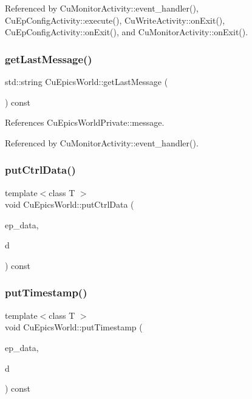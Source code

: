 Referenced by Cu\+Monitor\+Activity\+::event\+\_\+handler(), Cu\+Ep\+Config\+Activity\+::execute(), Cu\+Write\+Activity\+::on\+Exit(), Cu\+Ep\+Config\+Activity\+::on\+Exit(), and Cu\+Monitor\+Activity\+::on\+Exit().

\mbox{\label{classCuEpicsWorld_a0f5eb329733ebae6077a440c7610d98d}} 
\subsubsection{get\+Last\+Message()}
{\footnotesize\ttfamily std\+::string Cu\+Epics\+World\+::get\+Last\+Message (\begin{DoxyParamCaption}{ }\end{DoxyParamCaption}) const}



References Cu\+Epics\+World\+Private\+::message.



Referenced by Cu\+Monitor\+Activity\+::event\+\_\+handler().

\mbox{\label{classCuEpicsWorld_ab9e49deeb1b16c19b750e8352b9434ca}} 
\subsubsection{put\+Ctrl\+Data()}
{\footnotesize\ttfamily template$<$class T $>$ \\
void Cu\+Epics\+World\+::put\+Ctrl\+Data (\begin{DoxyParamCaption}\item[{void $\ast$}]{ep\+\_\+data,  }\item[{Cu\+Data \&}]{d }\end{DoxyParamCaption}) const}

\mbox{\label{classCuEpicsWorld_a02a981b4a4b8729d98b047b3d1a5662a}} 
\subsubsection{put\+Timestamp()}
{\footnotesize\ttfamily template$<$class T $>$ \\
void Cu\+Epics\+World\+::put\+Timestamp (\begin{DoxyParamCaption}\item[{void $\ast$}]{ep\+\_\+data,  }\item[{Cu\+Data \&}]{d }\end{DoxyParamCaption}) const}



